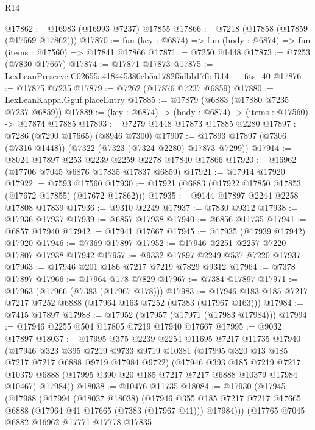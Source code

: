 \begin{lexlean}{R14}
\begin{coremodule}
@17862 := @16983 (@16993 @7237) @17855
@17866 := @7218 (@17858 (@17859 (@17669 @17862)))
@17870 := fun (key : @6874) => fun (body : @6874) => fun (items : @17560) => @17841 @17866
@17871 := @7250 @1448
@17873 := @7253 (@7830 @17667)
@17874 := @17871 @17873
@17875 := LexLeanPreserve.C02655a418445380eb5a1782f5dbb17fb.R14.__fits_40
@17876 := @17875 @7235
@17879 := @7262 (@17876 @7237 @6859)
@17880 := LexLeanKappa.Gguf.placeEntry
@17885 := @17879 (@6883 (@17880 @7235 @7237 @6859))
@17889 := (key : @6874) -> (body : @6874) -> (items : @17560) -> @17874 @17885
@17893 := @7279 @1448 @17873 @17885 @2280
@17897 := @7286 (@7290 @17665) (@8946 @7300)
@17907 := @17893 @17897 (@7306 (@7316 @1448)) (@7322 (@7323 (@7324 @2280) @17873 @7299))
@17914 := @8024 @17897 @253 @2239 @2259 @2278 @17840 @17866
@17920 := @16962 (@17706 @7045 @6876 @17835 @17837 @6859)
@17921 := @17914 @17920
@17922 := @7593 @17560
@17930 := @17921 (@6883 (@17922 @17850 @17853 (@17672 @17855) (@17672 @17862)))
@17935 := @9144 @17897 @2244 @2258 @17808 @17839
@17936 := @9310 @2249
@17937 := @7830 @9312
@17938 := @17936 @17937
@17939 := @6857 @17938
@17940 := @6856 @11735
@17941 := @6857 @17940
@17942 := @17941 @17667
@17945 := @17935 (@17939 @17942) @17920
@17946 := @7369 @17897
@17952 := @17946 @2251 @2257 @7220 @17807 @17938 @17942
@17957 := @9332 @17897 @2249 @537 @7220 @17937
@17963 := @17946 @201 @186 @7217 @7219 @7829 @9312
@17964 := @7378 @17897
@17966 := @17964 @178 @7829
@17967 := @7384 @17897
@17971 := @17963 (@17966 (@7383 (@17967 @178)))
@17983 := @17946 @183 @185 @7217 @7217 @7252 @6888 (@17964 @163 @7252 (@7383 (@17967 @163)))
@17984 := @7415 @17897
@17988 := @17952 (@17957 (@17971 (@17983 @17984)))
@17994 := @17946 @2255 @504 @17805 @7219 @17940 @17667
@17995 := @9032 @17897
@18037 := @17995
    @375
    @2239
    @2254
    @11695
    @7217
    @11735
    @17940
    (@17946
      @323
      @395
      @7219
      @9733
      @9719
      @10381
      (@17995 @320 @13 @185 @7217 @7217 @6888 @9719 @17984 @9722)
      (@17946
        @393
        @185
        @7219
        @7217
        @10379
        @6888
        (@17995 @390 @20 @185 @7217 @7217 @6888 @10379 @17984 @10467)
        @17984))
@18038 := @10476 @11735
@18084 := @17930
    (@17945
      (@17988
        (@17994
          (@18037 @18038)
          (@17946
            @355
            @185
            @7217
            @7217
            @17665
            @6888
            (@17964 @41 @17665 (@7383 (@17967 @41)))
            @17984)))
      (@17765
        @7045
        @6882
        @16962
        @17771
        @17778
        @17835

\end{coremodule}
\end{lexlean}
